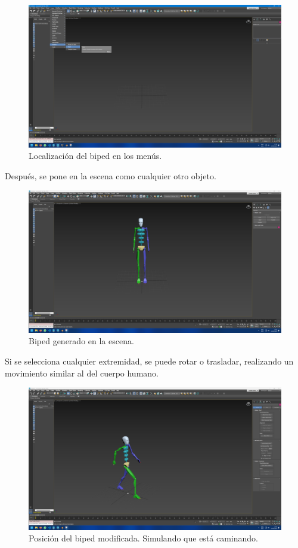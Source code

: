 \documentclass{article}
\begin{document}
\begin{figure}[H]
   \centering
   \includegraphics[width=\textwidth]{imagenes/menus.png}
   \caption{Localización del biped en los menús.}
\end{figure}

Después, se pone en la escena como cualquier otro objeto.

\begin{figure}[H]
   \centering
   \includegraphics[width=\textwidth]{imagenes/biped.png}
   \caption{Biped generado en la escena.}
\end{figure}

Si se selecciona cualquier extremidad, se puede rotar o trasladar, realizando un movimiento similar al del cuerpo humano.

\begin{figure}[H]
   \centering
   \includegraphics[width=\textwidth]{imagenes/bipedWalk.png}
   \caption{Posición del biped modificada. Simulando que está caminando.}
\end{figure}
\end{document}
